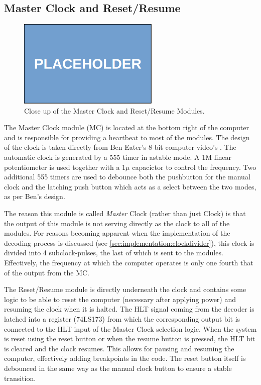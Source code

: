 \subsection{Master Clock and Reset/Resume} \label{sec:clock}
\begin{figure}[H]
  \centering
  \includegraphics[width=0.6\textwidth]{img/placeholder}
  \caption{Close up of the Master Clock and Reset/Resume Modules.}
  \label{fig:masterclockcloseup}
\end{figure}

The Master Clock module (MC) is located at the bottom right of the computer and is responsible for providing a heartbeat to most of the modules. The design of the clock is taken directly from Ben Eater's 8-bit computer video's \cite{beneater}. The automatic clock is generated by a 555 timer in astable mode. A 1M linear potentiometer is used together with a 1$\mu$ capacictor to control the frequency. Two additional 555 timers are used to debounce both the pushbutton for the manual clock and the latching push button which acts as a select between the two modes, as per Ben's design. 

The reason this module is called \emph{Master} Clock (rather than just Clock) is that the output of this module is not serving directly as the clock to all of the modules. For reasons becoming apparent when the implementation of the decoding process is discussed (see \ref{sec:implementation:clockdivider}), this clock is divided into 4 subclock-pulses, the last of which is sent to the modules. Effectively,  the frequency at which the computer operates is only one fourth that of the output from the MC.

The Reset/Resume module is directly underneath the clock and contains some logic to be able to reset the computer (necessary after applying power) and resuming the clock when it is halted. The HLT signal coming from the decoder is latched into a register (74LS173) from which the corresponding output bit is connected to the HLT input of the Master Clock selection logic. When the system is reset using the reset button or when the resume button is pressed, the HLT bit is cleared and the clock resumes. This allows for pausing and resuming the computer, effectively adding breakpoints in the code. The reset button itself is debounced in the same way as the manual clock button to ensure a stable transition. 

